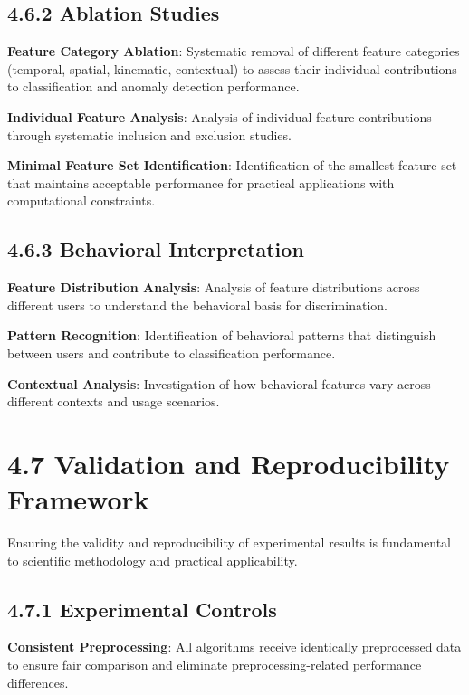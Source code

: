 \documentclass[
  12pt,
  a4paper,
]{report}
\begin{document}
\subsection{4.6.2 Ablation Studies}\label{ablation-studies}

\textbf{Feature Category Ablation}: Systematic removal of different
feature categories (temporal, spatial, kinematic, contextual) to assess
their individual contributions to classification and anomaly detection
performance.

\textbf{Individual Feature Analysis}: Analysis of individual feature
contributions through systematic inclusion and exclusion studies.

\textbf{Minimal Feature Set Identification}: Identification of the
smallest feature set that maintains acceptable performance for practical
applications with computational constraints.

\subsection{4.6.3 Behavioral
Interpretation}\label{behavioral-interpretation}

\textbf{Feature Distribution Analysis}: Analysis of feature
distributions across different users to understand the behavioral basis
for discrimination.

\textbf{Pattern Recognition}: Identification of behavioral patterns that
distinguish between users and contribute to classification performance.

\textbf{Contextual Analysis}: Investigation of how behavioral features
vary across different contexts and usage scenarios.

\section{4.7 Validation and Reproducibility
Framework}\label{validation-and-reproducibility-framework}

Ensuring the validity and reproducibility of experimental results is
fundamental to scientific methodology and practical applicability.

\subsection{4.7.1 Experimental Controls}\label{experimental-controls}

\textbf{Consistent Preprocessing}: All algorithms receive identically
preprocessed data to ensure fair comparison and eliminate
preprocessing-related performance differences.
\end{document}
